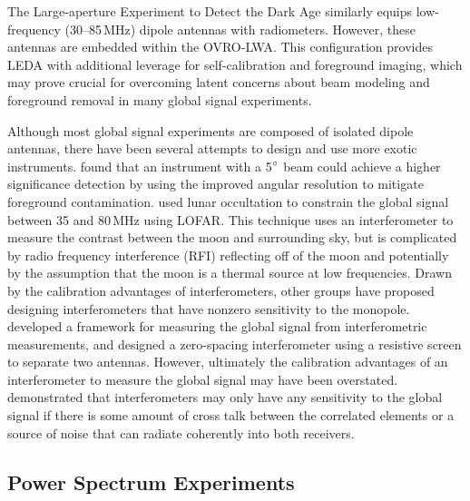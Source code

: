 \begin{bibunit}
The Large-aperture Experiment to Detect the Dark Age \citep[LEDA;][]{2018MNRAS.478.4193P} similarly
equips low-frequency (30--85\,MHz) dipole antennas with radiometers. However, these antennas are
embedded within the OVRO-LWA.  This configuration provides LEDA with additional leverage for
self-calibration and foreground imaging, which may prove crucial for overcoming latent concerns
about beam modeling and foreground removal in many global signal experiments.

\citet{2017ApJ...845L..12S}

Although most global signal experiments are composed of isolated dipole antennas, there have been
several attempts to design and use more exotic instruments. \citet{2013PhRvD..87d3002L} found that
an instrument with a 5$\mbox{$^\circ$}$ beam could achieve a higher significance detection by using the
improved angular resolution to mitigate foreground contamination. \citet{2015MNRAS.450.2291V} used
lunar occultation to constrain the global signal between 35 and 80\,MHz using LOFAR. This technique
uses an interferometer to measure the contrast between the moon and surrounding sky, but is
complicated by radio frequency interference (RFI) reflecting off of the moon and potentially by the
assumption that the moon is a thermal source at low frequencies. Drawn by the calibration advantages
of interferometers, other groups have proposed designing interferometers that have nonzero
sensitivity to the monopole. \citet{2015ApJ...809...18P} developed a framework for measuring the
global signal from interferometric measurements, and \citet{2015ApJ...815...88S} designed a
zero-spacing interferometer using a resistive screen to separate two antennas. However, ultimately
the calibration advantages of an interferometer to measure the global signal may have been
overstated.  \citet{2016ApJ...826..116V} demonstrated that interferometers may only have any
sensitivity to the global signal if there is some amount of cross talk between the correlated
elements or a source of noise that can radiate coherently into both receivers.

\subsection{Power Spectrum Experiments}


\end{bibunit}
